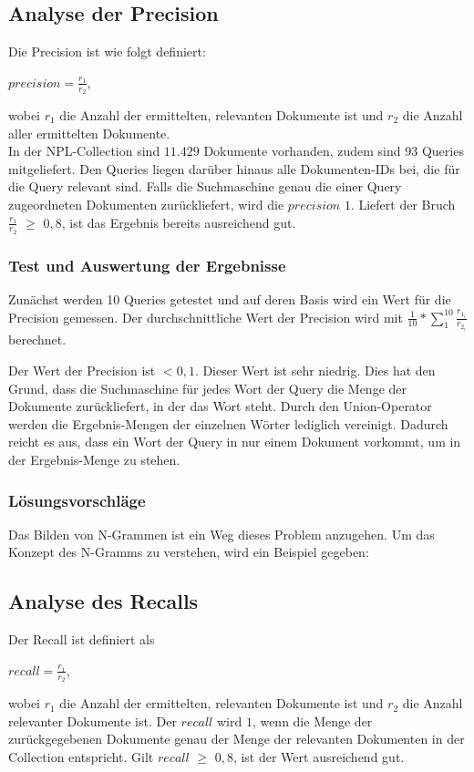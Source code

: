 \subsection{Analyse der Precision}
Die Precision ist wie folgt definiert:
\begin{center}
	$\displaystyle precision = \frac{r_1}{r_2}$,
\end{center}
wobei $r_1$ die Anzahl der ermittelten, relevanten Dokumente ist und $r_2$ die Anzahl aller ermittelten Dokumente.\\
In der NPL-Collection sind $11.429$ Dokumente vorhanden, zudem sind $93$ Queries mitgeliefert. Den Queries liegen darüber hinaus alle Dokumenten-IDs bei, die für die Query relevant sind. Falls die Suchmaschine genau die einer Query zugeordneten Dokumenten zurückliefert, wird die $precision$ $1$.
Liefert der Bruch $\frac{r_1}{r_2}$ $\ge$ $0,8$, ist das Ergebnis bereits ausreichend gut.

\subsubsection{Test und Auswertung der Ergebnisse}
Zunächst werden 10 Queries getestet und auf deren Basis wird ein Wert für die Precision gemessen. 
Der durchschnittliche Wert der Precision wird mit $\frac{1}{10} * \sum_{1}^{10} \frac{r_{1_i}}{r_{2_i}}$ berechnet.

Der Wert der Precision ist $< 0,1$. Dieser Wert ist sehr niedrig. Dies hat den Grund, dass die Suchmaschine für jedes Wort der Query die Menge der Dokumente zurückliefert, in der das Wort steht. Durch den Union-Operator werden die Ergebnis-Mengen der einzelnen Wörter lediglich vereinigt. Dadurch reicht es aus, dass ein Wort der Query in nur einem Dokument vorkommt, um in der Ergebnis-Menge zu stehen. 

\subsubsection{Lösungsvorschläge}
Das Bilden von N-Grammen ist ein Weg dieses Problem anzugehen. Um das Konzept des N-Gramms zu verstehen, wird ein Beispiel gegeben:


\subsection{Analyse des Recalls}
Der Recall ist definiert als
\begin{center}
	$\displaystyle recall = \frac{r_1}{r_2}$,
\end{center}
wobei $r_1$ die Anzahl der ermittelten, relevanten Dokumente ist und $r_2$ die Anzahl relevanter Dokumente ist.
Der $recall$ wird $1$, wenn die Menge der zurückgegebenen Dokumente genau der Menge der relevanten Dokumenten in der Collection entspricht.
Gilt $recall$ $\ge$ $0,8$, ist der Wert ausreichend gut.

